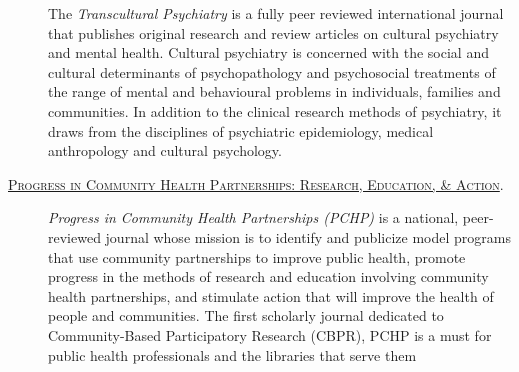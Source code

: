 \documentclass[]{tufte-handout}
\begin{document}
\begin{description}
The \emph{Transcultural Psychiatry} is a fully peer reviewed
international journal that publishes original research and review
articles on cultural psychiatry and mental health. Cultural psychiatry
is concerned with the social and cultural determinants of
psychopathology and psychosocial treatments of the range of mental and
behavioural problems in individuals, families and communities. In
addition to the clinical research methods of psychiatry, it draws from
the disciplines of psychiatric epidemiology, medical anthropology and
cultural psychology.
\item[\href{https://www.press.jhu.edu/journals/progress_in_community_health_partnerships/}{\textsc{Progress in Community Health Partnerships: Research, Education, \& Action}}.]
\emph{Progress in Community Health Partnerships (PCHP)} is a national,
peer-reviewed journal whose mission is to identify and publicize model
programs that use community partnerships to improve public health,
promote progress in the methods of research and education involving
community health partnerships, and stimulate action that will improve
the health of people and communities. The first scholarly journal
dedicated to Community-Based Participatory Research (CBPR), PCHP is a
must for public health professionals and the libraries that serve them
\end{description}

\newpage
\end{document}
